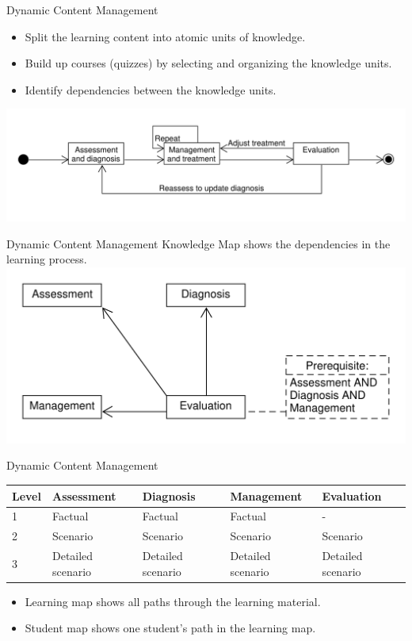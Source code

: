 \documentclass{beamer}
\begin{document}
\begin{frame}{Dynamic Content Management}
\begin{itemize}
	\item Split the learning content into atomic units of knowledge.
	\item Build up courses (quizzes) by selecting and organizing the knowledge units.
	\item Identify dependencies between the knowledge units.
\end{itemize}
\includegraphics[scale=0.44]{WorkflowGraph}
\end{frame}

\begin{frame}{Dynamic Content Management}
Knowledge Map shows the dependencies in the learning process. 
\includegraphics[scale=0.5]{Knowledge}
\end{frame}

\begin{frame}{Dynamic Content Management}
\begin{table}[h!]
\begin{tabular}{|m{2em}|m{6em}|m{6em}|m{6em}|m{6em}|}
	\hline
	 Level & Assessment & Diagnosis & Management & Evaluation \\
	\hline
	1  & Factual & Factual & Factual & - \\
	2 & Scenario & Scenario & Scenario & Scenario \\
	3 & Detailed scenario  & Detailed scenario & Detailed scenario & Detailed scenario \\
	\hline
\end{tabular}
\end{table}
\begin{itemize}
	\item Learning map shows all paths through the learning material.
	\item Student map shows one student's path in the learning map.
\end{itemize}
\end{frame}
\end{document}
